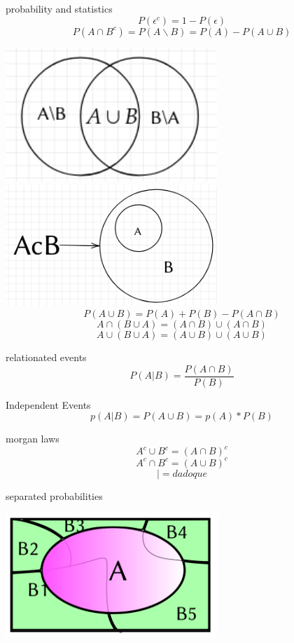 \newpage
\begin{section}{probability and statistics}
	$$P(\epsilon^{c})=1-P(\epsilon)$$	
	$$P(A \cap B^{c}) =P(A \backslash B) =  P(A) - P(A \cup B)$$

	\includegraphics[width=8cm]{1.png}
	\includegraphics[width=8cm]{2.png}
	$$P(A \cup B) =P(A) + P(B) - P(A \cap B) $$
	$$ A \cap (B \cup A ) = (A \cap B) \cup (A \cap B) $$
	$$ A \cup (B \cup A ) = (A \cup B) \cup (A \cup B) $$

	\begin{subsection}{relationated events}
		$$ P(A|B) = \frac{P(A \cap B )} { P(B) }$$
	\end{subsection}
	\begin{subsection}{Independent Events}
	$$ p(A|B) =  P(A \cup B) = p(A)*P(B) $$
	\end{subsection}

	\begin{subsection}{morgan laws}
	$$ A^{c} \cup B^{c} = (A \cap B)^{c} $$
	$$ A^{c} \cap B^{c} = (A \cup B)^{c} $$
	$$ | = dado que $$
	\newpage
	\end{subsection}
	\begin{subsection}{separated probabilities}
	\begin{center}

	\includegraphics[width=8cm]{3.png}


\end{center}
\end{subsection}
\end{section}
